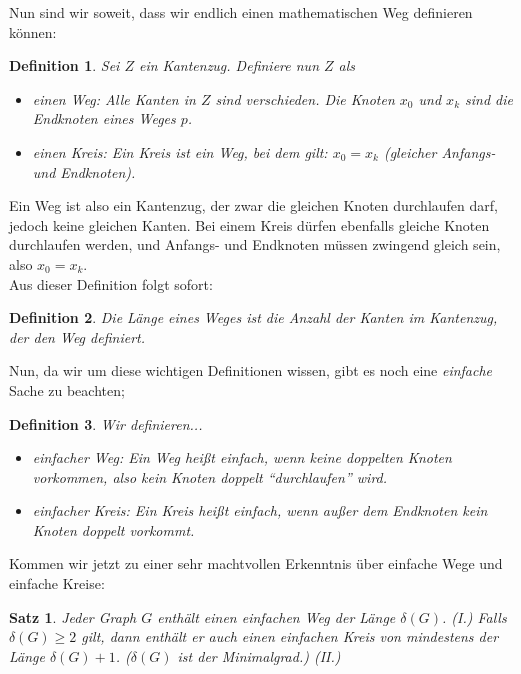 \documentclass{article}
\newtheorem{theorem}{Satz}
\newtheorem{definition}{Definition}
\begin{document}
\bigskip
Nun sind wir soweit, dass wir endlich einen mathematischen Weg definieren können:\\
\begin{definition}
	Sei $Z$ ein Kantenzug. Definiere nun $Z$ als
	\begin{itemize}
		\item einen \emph{Weg}: Alle Kanten in $Z$ sind verschieden. Die Knoten $x_0$ und $x_k$ sind die \emph{Endknoten} eines Weges $p$.
		\item einen \emph{Kreis}: Ein \emph{Kreis} ist ein Weg, bei dem gilt: $x_0 = x_k$ (gleicher Anfangs- und Endknoten).
	\end{itemize}
\end{definition}
\bigskip
Ein Weg ist also ein Kantenzug, der zwar die gleichen Knoten durchlaufen darf, jedoch keine gleichen Kanten. Bei einem Kreis dürfen ebenfalls gleiche Knoten durchlaufen werden, und Anfangs- und Endknoten müssen zwingend gleich sein, also $x_0 = x_k$.\\
\bigskip
Aus dieser Definition folgt sofort:
\begin{definition}
	Die \emph{Länge} eines Weges ist die Anzahl der Kanten im Kantenzug, der den Weg definiert.
\end{definition}
\bigskip
Nun, da wir um diese wichtigen Definitionen wissen, gibt es noch eine \emph{einfache} Sache zu beachten;\\
\begin{definition}
	Wir definieren...
	\begin{itemize}
		\item \emph{einfacher Weg:} Ein Weg heißt \emph{einfach}, wenn keine doppelten Knoten vorkommen, also kein Knoten doppelt "`durchlaufen"' wird.
		\item \emph{einfacher Kreis:} Ein Kreis heißt \emph{einfach}, wenn außer dem Endknoten kein Knoten doppelt vorkommt.
	\end{itemize}
\end{definition}
Kommen wir jetzt zu einer sehr machtvollen Erkenntnis über einfache Wege und einfache Kreise:\\
\begin{theorem}
	Jeder Graph $G$ enthält einen einfachen Weg der Länge $\delta(G)$. \emph{(I.)} Falls $\delta(G) \geq 2$ gilt, dann enthält er auch einen einfachen Kreis von mindestens der Länge $\delta(G) + 1$. ($\delta(G)$ ist der Minimalgrad.) \emph{(II.)}
\end{theorem}
\end{document}
